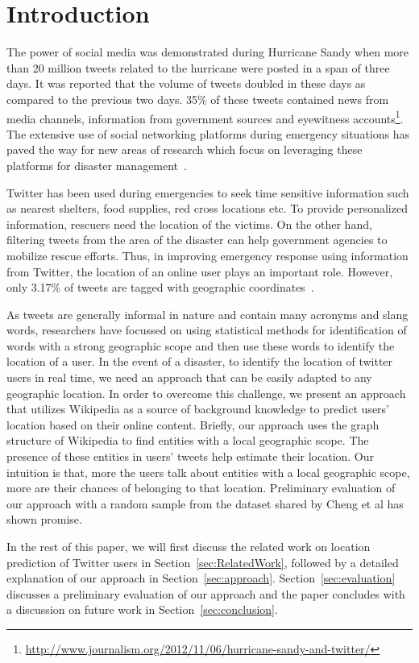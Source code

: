 \section{Introduction}
\label{sec:Introduction}

The power of social media was demonstrated during Hurricane Sandy when more than 20 million tweets related to the hurricane were posted in a span of three days. It was reported that the volume of tweets doubled in these days as compared to the previous two days. 35\% of these tweets contained news from media channels, information from government sources and eyewitness accounts\footnote{\url{http://www.journalism.org/2012/11/06/hurricane-sandy-and-twitter/}}. The extensive use of social networking platforms during emergency situations has paved the way for new areas of research which focus on leveraging these platforms for disaster management~\cite{purohit2013emergency}. 

Twitter has been used during emergencies to seek time sensitive information such as nearest shelters, food supplies, red cross locations etc. To provide personalized information, rescuers need the location of the victims. On the other hand, filtering tweets from the area of the disaster can help government agencies to mobilize rescue efforts. Thus, in improving emergency response using information from Twitter, the location of an online user plays an important role. However, only  3.17\% of tweets are tagged with geographic coordinates~\cite{morstatter2013sample}. 

As tweets are generally informal in nature and contain many acronyms and slang words, researchers have focussed on using statistical methods for identification of words with a strong geographic scope and then use these words to identify the location of a user. In the event of a disaster, to identify the location of twitter users in real time, we need an approach that can be easily adapted to any geographic location. In order to overcome this challenge, we present an approach that utilizes Wikipedia as a source of background knowledge to predict users' location based on their online content. Briefly, our approach uses the graph structure of Wikipedia to find entities with a local geographic scope. The presence of these entities in users' tweets help estimate their location. Our intuition is that, more the users talk about entities with a local geographic scope, more are their chances of belonging to that location. Preliminary evaluation of our approach with a random sample from the dataset shared by Cheng et al\cite{cheng2010you} has shown promise.   

In the rest of this paper, we will first discuss the related work on location prediction of Twitter users in Section~\ref{sec:RelatedWork}, followed by a detailed explanation of our approach in Section~\ref{sec:approach}. Section~\ref{sec:evaluation} discusses a preliminary evaluation of our approach and the paper concludes with a discussion on future work in Section~\ref{sec:conclusion}. 
